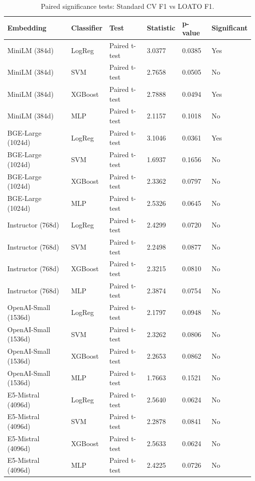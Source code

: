 \begin{table}[htbp]
\centering
\caption{Paired significance tests: Standard CV F1 vs LOATO F1.}
\label{tab:significance}
\begin{tabular}{llllll}
\toprule
Embedding & Classifier & Test & Statistic & p-value & Significant \\
\midrule
MiniLM (384d) & LogReg & Paired t-test & 3.0377 & 0.0385 & Yes \\
MiniLM (384d) & SVM & Paired t-test & 2.7658 & 0.0505 & No \\
MiniLM (384d) & XGBoost & Paired t-test & 2.7888 & 0.0494 & Yes \\
MiniLM (384d) & MLP & Paired t-test & 2.1157 & 0.1018 & No \\
BGE-Large (1024d) & LogReg & Paired t-test & 3.1046 & 0.0361 & Yes \\
BGE-Large (1024d) & SVM & Paired t-test & 1.6937 & 0.1656 & No \\
BGE-Large (1024d) & XGBoost & Paired t-test & 2.3362 & 0.0797 & No \\
BGE-Large (1024d) & MLP & Paired t-test & 2.5326 & 0.0645 & No \\
Instructor (768d) & LogReg & Paired t-test & 2.4299 & 0.0720 & No \\
Instructor (768d) & SVM & Paired t-test & 2.2498 & 0.0877 & No \\
Instructor (768d) & XGBoost & Paired t-test & 2.3215 & 0.0810 & No \\
Instructor (768d) & MLP & Paired t-test & 2.3874 & 0.0754 & No \\
OpenAI-Small (1536d) & LogReg & Paired t-test & 2.1797 & 0.0948 & No \\
OpenAI-Small (1536d) & SVM & Paired t-test & 2.3262 & 0.0806 & No \\
OpenAI-Small (1536d) & XGBoost & Paired t-test & 2.2653 & 0.0862 & No \\
OpenAI-Small (1536d) & MLP & Paired t-test & 1.7663 & 0.1521 & No \\
E5-Mistral (4096d) & LogReg & Paired t-test & 2.5640 & 0.0624 & No \\
E5-Mistral (4096d) & SVM & Paired t-test & 2.2878 & 0.0841 & No \\
E5-Mistral (4096d) & XGBoost & Paired t-test & 2.5633 & 0.0624 & No \\
E5-Mistral (4096d) & MLP & Paired t-test & 2.4225 & 0.0726 & No \\
\bottomrule
\end{tabular}

\end{table}
